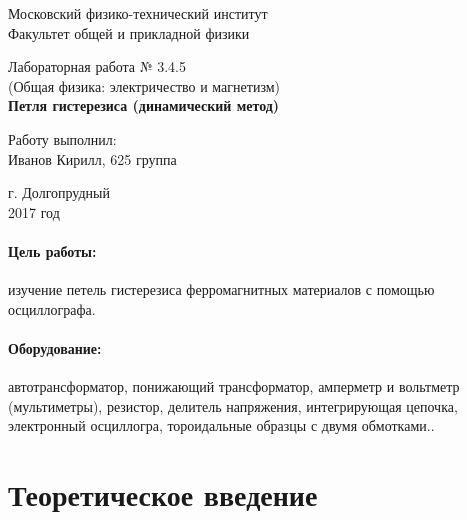 \documentclass[12pt]{kiarticle}
\begin{document}
		
		\begin{titlepage}
			\begin{center}
				\large 	Московский физико-технический институт \\
				Факультет общей и прикладной физики \\
				\vspace{0.2cm}
				
				\vspace{4.5cm}
				Лабораторная работа № 3.4.5 \\ \vspace{0.2cm}
				\large (Общая физика: электричество и магнетизм) \\ \vspace{0.2cm}
				\LARGE \textbf{Петля гистерезиса (динамический метод)}
			\end{center}
			\vspace{2.3cm} \large
			
			\begin{center}
				Работу выполнил: \\
				Иванов Кирилл,
				625 группа
				\vspace{10mm}		
				
			\end{center}
			
			\begin{center} \vspace{60mm}
				г. Долгопрудный \\
				2017 год
			\end{center}
		\end{titlepage}

	
	\paragraph*{Цель работы:} изучение петель гистерезиса ферромагнитных материалов с помощью осциллографа.
	
	\paragraph*{Оборудование:} автотрансформатор, понижающий трансформатор, амперметр и вольтметр (мультиметры), резистор, делитель напряжения, интегрирующая
	цепочка, электронный осциллогра, тороидальные образцы с двумя обмотками..
	
	\section{Теоретическое введение}
	
\end{document}
